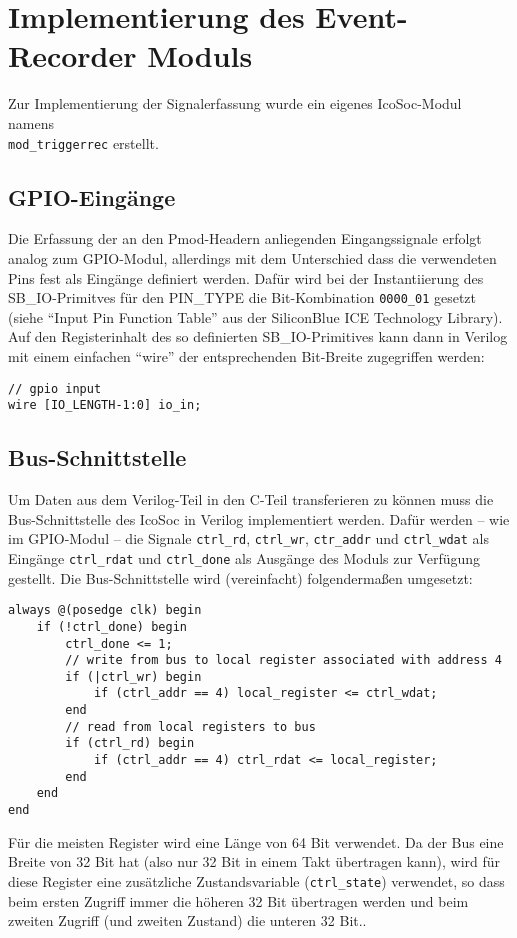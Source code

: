 {\section{Implementierung des Event-Recorder Moduls}
\label{ch:Implementierung:sec:Event-Recorder}

Zur Implementierung der Signalerfassung wurde ein eigenes IcoSoc-Modul namens \\{\tt mod\_triggerrec} erstellt.
\subsection{GPIO-Eingänge}
Die Erfassung der an den Pmod-Headern anliegenden Eingangssignale erfolgt analog zum GPIO-Modul, allerdings mit dem Unterschied dass die verwendeten Pins fest als Eingänge definiert werden.
Dafür wird bei der Instantiierung des SB\_IO-Primitves für den PIN\_TYPE die Bit-Kombination {\tt 0000\_01} gesetzt (siehe ``Input Pin Function Table'' aus der SiliconBlue ICE Technology Library\cite[S.~73]{doc:tec_lib}).\\ 
Auf den Registerinhalt des so definierten SB\_IO-Primitives kann dann in Verilog mit einem einfachen ``wire'' der entsprechenden Bit-Breite zugegriffen werden:
\begin{verbatim}
// gpio input
wire [IO_LENGTH-1:0] io_in;
\end{verbatim}

\subsection{Bus-Schnittstelle}
Um Daten aus dem Verilog-Teil in den C-Teil transferieren zu können muss die Bus-Schnittstelle des IcoSoc in Verilog implementiert werden.
Dafür werden -- wie im GPIO-Modul -- die Signale {\tt ctrl\_rd}, {\tt ctrl\_wr}, {\tt ctr\_addr} und {\tt ctrl\_wdat} als Eingänge {\tt ctrl\_rdat} und {\tt ctrl\_done} als Ausgänge des Moduls zur Verfügung gestellt.
Die Bus-Schnittstelle wird (vereinfacht) folgendermaßen umgesetzt:
\begin{verbatim}
always @(posedge clk) begin		
	if (!ctrl_done) begin
		ctrl_done <= 1;
		// write from bus to local register associated with address 4
		if (|ctrl_wr) begin
			if (ctrl_addr == 4) local_register <= ctrl_wdat;
		end
		// read from local registers to bus
		if (ctrl_rd) begin
			if (ctrl_addr == 4) ctrl_rdat <= local_register;
		end
	end
end
\end{verbatim}

Für die meisten Register wird eine Länge von 64 Bit verwendet. Da der Bus eine Breite von 32 Bit hat (also nur 32 Bit in einem Takt übertragen kann), wird für diese Register eine zusätzliche Zustandsvariable ({\tt ctrl\_state}) verwendet, so dass beim ersten Zugriff immer die höheren 32 Bit übertragen werden und beim zweiten Zugriff (und zweiten Zustand) die unteren 32 Bit.. 

}
